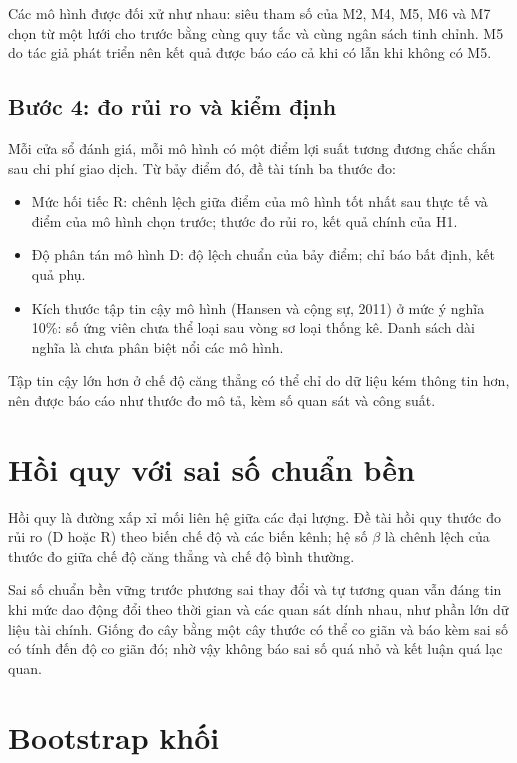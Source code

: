 Các mô hình được đối xử như nhau: siêu tham số của M2, M4, M5, M6 và M7 chọn từ một lưới cho trước bằng cùng quy tắc và cùng ngân sách tinh chỉnh. M5 do tác giả phát triển nên kết quả được báo cáo cả khi có lẫn khi không có M5.

\subsection{Bước 4: đo rủi ro và kiểm định}

Mỗi cửa sổ đánh giá, mỗi mô hình có một điểm lợi suất tương đương chắc chắn sau chi phí giao dịch. Từ bảy điểm đó, đề tài tính ba thước đo:

\begin{itemize}
\item
  Mức hối tiếc R: chênh lệch giữa điểm của mô hình tốt nhất sau thực tế và điểm của mô hình chọn trước; thước đo rủi ro, kết quả chính của H1.
\item
  Độ phân tán mô hình D: độ lệch chuẩn của bảy điểm; chỉ báo bất định, kết quả phụ.
\item
  Kích thước tập tin cậy mô hình (Hansen và cộng sự, 2011) ở mức ý nghĩa 10\%: số ứng viên chưa thể loại sau vòng sơ loại thống kê. Danh sách dài nghĩa là chưa phân biệt nổi các mô hình.
\end{itemize}

Tập tin cậy lớn hơn ở chế độ căng thẳng có thể chỉ do dữ liệu kém thông tin hơn, nên được báo cáo như thước đo mô tả, kèm số quan sát và công suất.

\section{Hồi quy với sai số chuẩn bền}

Hồi quy là đường xấp xỉ mối liên hệ giữa các đại lượng. Đề tài hồi quy thước đo rủi ro (D hoặc R) theo biến chế độ và các biến kênh; hệ số \texorpdfstring{$\beta$}{beta} là chênh lệch của thước đo giữa chế độ căng thẳng và chế độ bình thường.

Sai số chuẩn bền vững trước phương sai thay đổi và tự tương quan vẫn đáng tin khi mức dao động đổi theo thời gian và các quan sát dính nhau, như phần lớn dữ liệu tài chính. Giống đo cây bằng một cây thước có thể co giãn và báo kèm sai số có tính đến độ co giãn đó; nhờ vậy không báo sai số quá nhỏ và kết luận quá lạc quan.

\section{Bootstrap khối}

